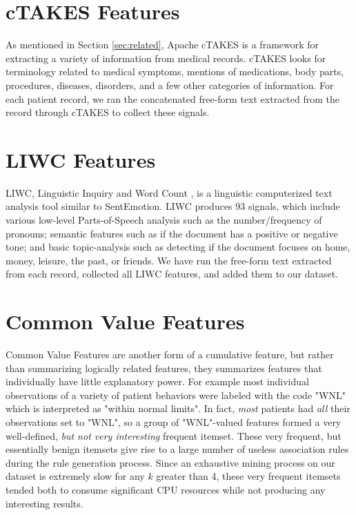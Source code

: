  \section{cTAKES Features} As mentioned in Section \ref{sec:related}, \textsf{Apache cTAKES} is a framework for extracting a variety of information from medical records.
 \textsf{cTAKES} looks for terminology related to medical symptoms, mentions
 of medications, body parts, procedures, diseases, disorders, and a few other
 categories of information.  For each patient record, we ran the concatenated free-form text
 extracted from the record through \textsf{cTAKES} to collect these signals.
 

 \section{LIWC Features}
  \textsf{LIWC}, Linguistic Inquiry and Word Count  \cite{liwc}, is a linguistic computerized text analysis tool similar to SentEmotion. 
 \textsf{LIWC} produces 93 signals, which include various low-level Parts-of-Speech analysis such as the number/frequency of pronouns; 
 semantic features such as if the document has a positive or negative tone; and basic topic-analysis such as detecting if the document focuses on home, money, leisure, the past, or friends.
 We have run the free-form text extracted from each record, collected all
 \textsf{LIWC} features, and added them to our dataset.
 

 \section{Common Value Features}
\textsf{Common Value Features} are another form of a cumulative feature, but rather than summarizing logically related features, they summarizes features that individually have little explanatory power.
For example most individual observations of a variety of patient behaviors
were labeled with the code \textsf{"WNL"} which is interpreted as \textsf{"within normal limits"}.  In fact, \textit{most} patients had \textit{all} their observations
set to \textsf{"WNL"}, so a group of \textsf{"WNL"}-valued features
formed a very well-defined, \textit{but not very interesting} frequent itemset.
These very frequent, but essentially benign itemsets give rise to a large number of 
useless association rules during the rule generation process. Since an exhaustive
mining process on our dataset is extremely slow for any $k$ greater than 4, these \textsf{very frequent itemsets} tended both to consume
significant CPU resources while not producing any interesting results.

